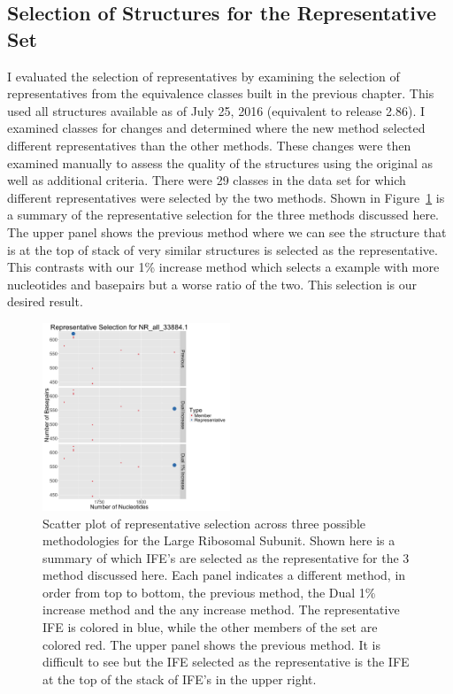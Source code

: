 \subsection{Selection of Structures for the Representative Set}

I evaluated the selection of representatives by examining the selection of
representatives from the equivalence classes built in the previous chapter. This
used all structures available as of July 25, 2016 (equivalent to release 2.86).
I examined classes for changes and determined where the new method selected
different representatives than the other methods. These changes were then
examined manually to assess the quality of the structures using the original as
well as additional criteria. There were 29 classes in the data set for which
different representatives were selected by the two methods. Shown in
Figure~\ref{fig:hm-lsu-rep} is a summary of the representative selection for the
three methods discussed here. The upper panel shows the previous method where we
can see the structure that is at the top of stack of very similar structures is
selected as the representative. This contrasts with our 1\% increase method which
selects a example with more nucleotides and basepairs but a worse ratio of the
two. This selection is our desired result.

\begin{figure}
  \includegraphics[width=0.5\textwidth]{chapter-4/figs/hm-lsu-rep}
  \caption{Scatter plot of representative selection across three possible
    methodologies for the \HM{} Large Ribosomal Subunit. Shown here is a summary
    of which IFE’s are selected as the representative for the 3 method discussed
    here. Each panel indicates a different method, in order from top to bottom,
    the previous method, the Dual 1\% increase method and the any increase
    method. The representative IFE is colored in blue, while the other members
    of the set are colored red. The upper panel shows the previous method. It is
    difficult to see but the IFE selected as the representative is the IFE at
    the top of the stack of IFE’s
  in the upper right.}
  \label{fig:hm-lsu-rep}
\end{figure}


